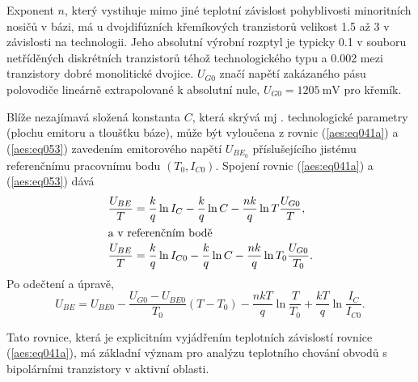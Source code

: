         Exponent \(n\), který vystihuje mimo jiné teplotní závislost pohyblivosti minoritních nosičů
        v bázi, má u dvojdifúzních křemíkových tranzistorů velikost \num{1.5} až 3 v závislosti na
        technologii. Jeho absolutní výrobní rozptyl je typicky \num{0.1} v souboru netříděných
        diskrétních tranzistorů téhož technologického typu a \num{0.002} mezi tranzistory dobré
        monolitické dvojice. \(U_{G0}\) značí napětí zakázaného pásu polovodiče lineárně
        extrapolované k absolutní nule, \(U_{G0} = \qty{1205}{\mV}\) pro křemík.

        Blíže nezajímavá složená konstanta \(C\), která skrývá mj . technologické parametry (plochu
        emitoru a tloušťku báze), může být vyloučena z rovnic (\ref{aes:eq041a}) a (\ref{aes:eq053})
        zavedením emitorového napětí \(U_{BE_0}\) příslušejícího jistému referenčnímu pracovnímu
        bodu \((T_0, I_{C0})\). Spojení rovnic (\ref{aes:eq041a}) a (\ref{aes:eq053}) dává
        \begin{align*}
          \dfrac{U_{BE}}{T} &= \dfrac{k}{q}\ln{I_C} - \dfrac{k}{q}\ln{C} - \dfrac{nk}{q}\ln{T}
                               \dfrac{U_{G0}}{T},   \\
          \shortintertext{a v referenčním bodě}
          \dfrac{U_{BE}}{T} &= \dfrac{k}{q}\ln{I_{C0}} - \dfrac{k}{q}\ln{C} - \dfrac{nk}{q}\ln{T_0}
                               \dfrac{U_{G0}}{T_0}. 
        \end{align*}
        Po odečtení a úpravě,
        \begin{equation}\label{aes:eq054}
          U_{BE} = U_{BE0} - \dfrac{U_{G0} - U_{BE0}}{T_0}(T - T_0) - 
                   \dfrac{nkT}{q}\ln\dfrac{T}{T_0} + \dfrac{kT}{q}\ln\dfrac{I_C}{I_{C0}}.
        \end{equation}

        Tato rovnice, která je explicitním vyjádřením teplotních závislostí rovnice
        (\ref{aes:eq041a}), má základní význam pro analýzu teplotního chování obvodů s bipolárními
        tranzistory v aktivní oblasti.

